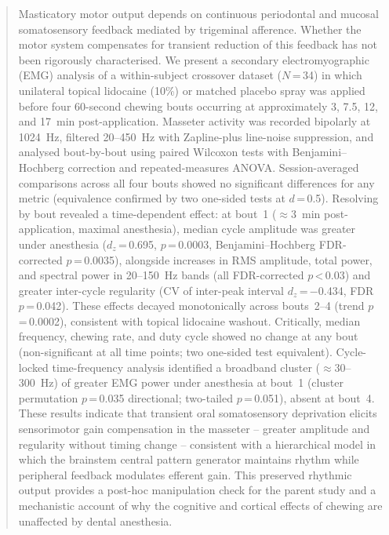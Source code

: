﻿\begin{abstract}
Masticatory motor output depends on continuous periodontal and mucosal
somatosensory feedback mediated by trigeminal afference.
Whether the motor system compensates for transient reduction of this feedback
has not been rigorously characterised.
We present a secondary electromyographic (EMG) analysis of a within-subject
crossover dataset ($N$\,=\,34) in which unilateral topical lidocaine (10\%) or
matched placebo spray was applied before four 60-second chewing bouts occurring
at approximately 3, 7.5, 12, and 17~min post-application.
Masseter activity was recorded bipolarly at 1024~Hz, filtered 20--450~Hz with
Zapline-plus line-noise suppression, and analysed bout-by-bout using paired
Wilcoxon tests with Benjamini--Hochberg correction and repeated-measures ANOVA.
Session-averaged comparisons across all four bouts showed no significant
differences for any metric (equivalence confirmed by two one-sided tests at
$d$\,=\,0.5).
Resolving by bout revealed a time-dependent effect: at bout~1
($\approx$3~min post-application, maximal anesthesia), median cycle amplitude
was greater under anesthesia ($d_z$\,=\,0.695, $p$\,=\,0.0003,
Benjamini--Hochberg FDR-corrected $p$\,=\,0.0035), alongside increases in
RMS amplitude, total power, and spectral power in 20--150~Hz bands
(all FDR-corrected $p$\,<\,0.03) and greater inter-cycle regularity
(CV of inter-peak interval $d_z$\,=\,$-$0.434, FDR $p$\,=\,0.042).
These effects decayed monotonically across bouts~2--4 (trend $p$\,=\,0.0002),
consistent with topical lidocaine washout.
Critically, median frequency, chewing rate, and duty cycle showed no change at
any bout (non-significant at all time points; two one-sided test equivalent).
Cycle-locked time-frequency analysis identified a broadband cluster
($\approx$30--300~Hz) of greater EMG power under anesthesia at bout~1
(cluster permutation $p$\,=\,0.035 directional; two-tailed $p$\,=\,0.051),
absent at bout~4.
These results indicate that transient oral somatosensory deprivation elicits
sensorimotor gain compensation in the masseter -- greater amplitude and
regularity without timing change -- consistent with a hierarchical model in
which the brainstem central pattern generator maintains rhythm while peripheral
feedback modulates efferent gain.
This preserved rhythmic output provides a post-hoc manipulation check for the
parent study and a mechanistic account of why the cognitive and cortical effects
of chewing are unaffected by dental anesthesia.
\end{abstract}

